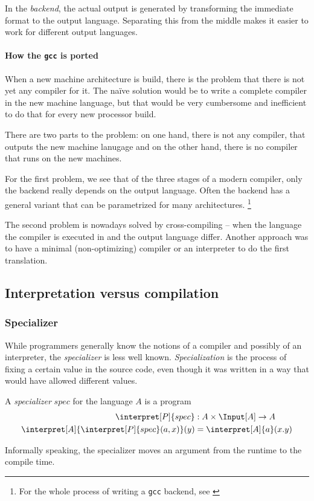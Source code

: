 In the \emph{backend}, the actual output is generated by transforming the 
immediate format to the output language. Separating this from the middle 
makes it easier to work for different output languages.

\paragraph{How the {\tt gcc} is ported} %
\label{par:gcc}
When a new machine architecture is build, there is the problem that there is 
not yet any compiler for it. The naïve solution would be to write a complete 
compiler in the new machine language, but that would be very cumbersome and 
inefficient to do that for every new processor build.

There are two parts to the problem: on one hand, there is not any compiler, 
that outputs the new machine lanugage and on the other hand, there is no 
compiler that runs on the new machines.

For the first problem, we see that of the three stages of a modern compiler,
only the backend really depends on the output language. Often the backend has 
a general variant that can be parametrized for many architectures.
\footnote{For the whole process of writing a {\tt gcc} backend, see \cite{nilsson2000porting}}

The second problem is nowadays solved by cross-compiling -- when the language 
the compiler is executed in and the output language differ. Another approach 
was to have a minimal (non-optimizing) compiler or an interpreter to do the 
first translation.

\subsection{Interpretation versus compilation}

\subsubsection{Specializer} %
\label{sub:Specializer}
While programmers generally know the notions of a compiler and possibly of an 
interpreter, the \emph{specializer} is less well known. \emph{Specialization} 
is the process of fixing a certain value in the source code, even though it 
was written in a way that would have allowed different values. 

\begin{defn}
	A \emph{specializer} $spec$ for the language $A$ is a program 
	\begin{align*}
		\interpret[P]{spec}&:A\times \Input[A]\rightarrow A \\
		\interpret[A]{\interpret[P]{spec}(a, x)}(y) &= \interpret[A]{a}(x.y)
	\end{align*}

	Informally speaking, the specializer moves an argument from the runtime to 
	the compile time.
\end{defn}

